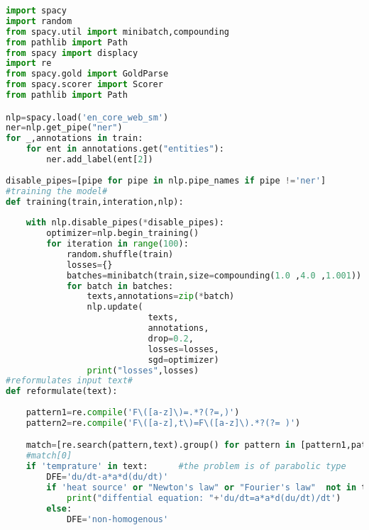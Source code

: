 
\lstset{style=mystyle}
\begin{lstlisting}[language=python]
import spacy 
import random 
from spacy.util import minibatch,compounding 
from pathlib import Path 
from spacy import displacy 
import re 
from spacy.gold import GoldParse
from spacy.scorer import Scorer
from pathlib import Path

nlp=spacy.load('en_core_web_sm')
ner=nlp.get_pipe("ner")
for _,annotations in train:
    for ent in annotations.get("entities"):
        ner.add_label(ent[2])
        
disable_pipes=[pipe for pipe in nlp.pipe_names if pipe !='ner']
#training the model#
def training(train,interation,nlp):
    
    with nlp.disable_pipes(*disable_pipes):
        optimizer=nlp.begin_training()
        for iteration in range(100):
            random.shuffle(train)
            losses={}
            batches=minibatch(train,size=compounding(1.0 ,4.0 ,1.001))
            for batch in batches:
                texts,annotations=zip(*batch)
                nlp.update(
                            texts,
                            annotations,
                            drop=0.2,
                            losses=losses,
                            sgd=optimizer)
                print("losses",losses)
#reformulates input text#
def reformulate(text):
    
    pattern1=re.compile('F\([a-z]\)=.*?(?=,)')
    pattern2=re.compile('F\([a-z],t\)=F\([a-z]\).*?(?= )')

    match=[re.search(pattern,text).group() for pattern in [pattern1,pattern2] if re.search(pattern,text) is not None]
    #match[0]
    if 'temprature' in text:      #the problem is of parabolic type 
        DFE='du/dt-a*a*d(du/dt)'
        if 'heat source' or "Newton's law" or "Fourier's law"  not in text: #equation is homogenous
            print("diffential equation: "+'du/dt=a*a*d(du/dt)/dt')
        else:
            DFE='non-homogenous' 
        

\end{lstlisting}
